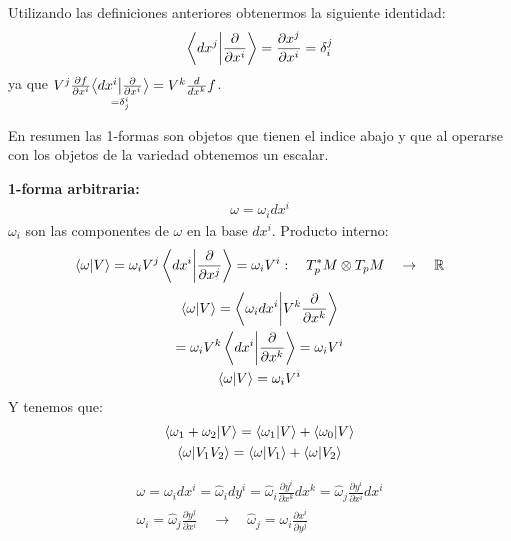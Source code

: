 \documentclass{article}
\begin{document}
Utilizando las definiciones anteriores obtenermos la siguiente identidad: 
\begin{gather*}
  \bra{dx ^ {j }}\ket{\frac{\partial  }{\partial x ^ {i }}} = \frac{\partial x ^ {j } }{\partial x ^ {i }} = \delta _{i } ^ {j }
\end{gather*}
ya que $ V ^ {j } \frac{\partial f  }{\partial x ^ {i }} \underset{ = \delta _{j } ^ {i }}{\bra{d x ^ {i }}\ket{\frac{\partial  }{\partial x ^ {i }}}} = V ^ {k } \frac{d  }{d x ^ {k }}f   $.

En resumen las 1-formas son objetos que tienen el indice abajo y que al operarse con los objetos de la variedad obtenemos un escalar.

\textbf{1-forma arbitraria: }
\begin{gather*}
  \omega = \omega_i dx ^ {i }
\end{gather*}
$ \omega_i  $ son las componentes de $ \omega  $ en la base $ dx ^ {i } $.
Producto interno: 
\begin{gather*}
  \bra{\omega }\ket{V } = \omega_i V ^ {j } \bra{dx ^ {i }}\ket{\frac{\partial  }{\partial x ^ {j }}} = \omega_i V ^ {i }: \quad T_p ^ {* }M \otimes T_p M \quad \rightarrow \quad \mathbb{R}
\end{gather*}
\begin{gather*}
  \bra{\omega}\ket{V } = \bra{\omega_i dx ^ {i }}\ket{V ^ {k } \frac{\partial  }{\partial x ^ {k }}}\\
  = \omega_i V ^ {k }\bra{dx ^ {i }}\ket{\frac{\partial  }{\partial x ^ {k }}} = \omega_i V ^ {i }\\
  \bra{\omega}\ket{V } = \omega_i V^i  
\end{gather*}
Y tenemos que: 
\begin{gather*}
  \bra{\omega_1 + \omega_2 }\ket{V } = \bra{\omega_1 }\ket{V }+ \bra{\omega_0 }\ket{V }\\
  \bra{\omega }\ket{V_1V_2 } = \bra{\omega}\ket{V_1 } + \bra{\omega}\ket{V_2 }   
\end{gather*}

\hfill

\hfill 

\hfill 

\begin{gather*}
  \omega = \omega_i dx ^ {i } = \hat \omega_i dy ^ {i }
  = \hat \omega_i \frac{\partial y ^ {i } }{\partial x ^ {k }}dx ^ {k } = \hat \omega_j \frac{\partial y ^ {i } }{\partial x ^ {i }} dx ^ {i }\\ 
  \omega_i = \hat \omega_j \frac{\partial y ^ {j } }{\partial x ^ {i }} \quad \rightarrow \quad \hat \omega_j = \omega_i \frac{\partial x ^ {i } }{\partial y ^ {j }}
\end{gather*}
\end{document}

